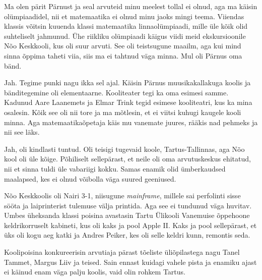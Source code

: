 


Ma olen pärit Pärnust ja seal arvuteid minu meelest tollal ei olnud, aga 
ma käisin olümpiaadidel, nii et matemaatika ei olnud minu jaoks 
mingi teema. Viiendas klassis
võitsin kuuenda klassi matemaatika linnaolümpiaadi, mille üle kõik olid suhteliselt 
jahmunud. Ühe riikliku olümpiaadi käigus viidi meid 
ekskursioonile Nõo Keskkooli, kus oli suur arvuti. See oli teistsugune maailm, aga kui mind sinna õppima 
taheti viia, siis ma ei tahtnud väga minna. Mul oli Pärnus oma bänd.


Jah. Tegime punki nagu ikka sel ajal. Käisin Pärnus muusikakallakuga koolis ja bänditegemine oli 
elementaarne. Kooliteater tegi ka oma esimesi samme. Kadunud Aare Laanemets ja Elmar 
Trink tegid esimese kooliteatri, kus ka mina osalesin. 
Kõik see oli nii tore ja ma mõtlesin, et ei viitsi kuhugi kaugele 
kooli minna. Aga matemaatikaõpetaja käis mu vanemate juures, rääkis nad 
pehmeks ja nii see läks. 


Jah, oli kindlasti tuntud. Oli teisigi tugevaid koole, 
Tartus-Tallinnas, aga Nõo kool oli üle kõige. Põhiliselt 
sellepärast, et neile oli oma arvutuskeskus ehitatud, nii et sinna tuldi üle 
vabariigi kokku. Samas enamik olid ümberkaudsed maalapsed, kes ei olnud võibolla väga suured geeniused. 

Nõo Keskkoolis oli Nairi 3-1, niisugune 
\emph{mainframe}, millele sai perfolinti sisse sööta ja laiprinterist 
tulemuse välja printida. Aga see ei tundunud väga huvitav. Umbes üheksanda klassi poisina 
avastasin Tartu Ülikooli Vanemuise õppehoone keldrikorruselt kabineti, kus oli 
kaks ja pool Apple II. Kaks ja pool sellepärast, 
et üks oli kogu aeg katki ja Andres Peiker, kes oli 
selle keldri kunn, remontis seda.

Koolipoisina konkureerisin arvutiaja pärast tõeliste 
üliõpilastega nagu Tanel Tammet, Margus 
Liiv ja teised. Sain ennast kuidagi 
vahele pista ja enamiku ajast ei käinud enam väga palju 
koolis, vaid olin rohkem Tartus.


